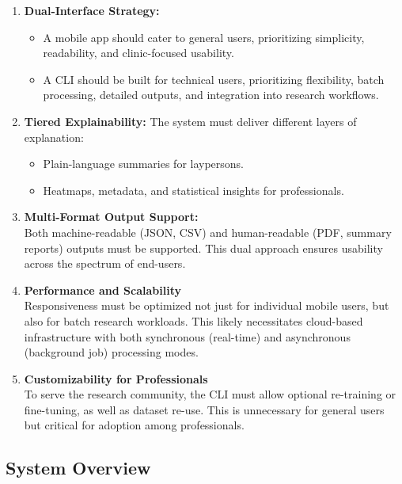 \documentclass[
  12pt,
  oneside]{article}
\providecommand{\tightlist}{%
  \setlength{\itemsep}{0pt}\setlength{\parskip}{0pt}}
\begin{document}
\begin{enumerate}
\def\labelenumi{\arabic{enumi}.}
\item
  \textbf{Dual-Interface Strategy:}

  \begin{itemize}
  \tightlist
  \item
    A mobile app should cater to general users, prioritizing simplicity,
    readability, and clinic-focused usability.\\
  \item
    A CLI should be built for technical users, prioritizing flexibility,
    batch processing, detailed outputs, and integration into research
    workflows.
  \end{itemize}
\item
  \textbf{Tiered Explainability:} The system must deliver different
  layers of explanation:

  \begin{itemize}
  \tightlist
  \item
    Plain-language summaries for laypersons.\\
  \item
    Heatmaps, metadata, and statistical insights for professionals.
  \end{itemize}
\item
  \textbf{Multi-Format Output Support:}\\
  Both machine-readable (JSON, CSV) and human-readable (PDF, summary
  reports) outputs must be supported. This dual approach ensures
  usability across the spectrum of end-users.
\item
  \textbf{Performance and Scalability}\\
  Responsiveness must be optimized not just for individual mobile users,
  but also for batch research workloads. This likely necessitates
  cloud-based infrastructure with both synchronous (real-time) and
  asynchronous (background job) processing modes.
\item
  \textbf{Customizability for Professionals}\\
  To serve the research community, the CLI must allow optional
  re-training or fine-tuning, as well as dataset re-use. This is
  unnecessary for general users but critical for adoption among
  professionals.
\end{enumerate}

\subsection{System Overview}\label{system-overview}
\end{document}
